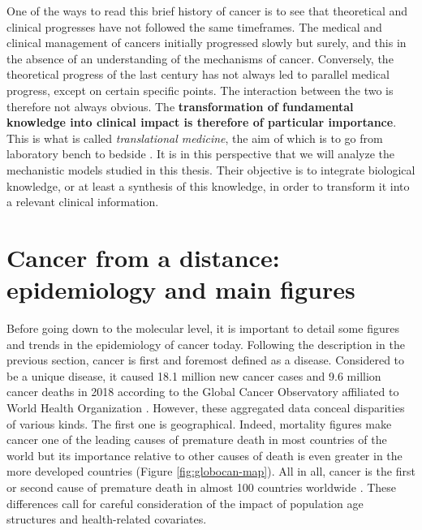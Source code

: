 \documentclass[a4paper,12pt,twoside,onecolumn,openright,final,oldfontcommands]{memoir}
\begin{document}
One of the ways to read this brief history of cancer is to see that
theoretical and clinical progresses have not followed the same
timeframes. The medical and clinical management of cancers initially
progressed slowly but surely, and this in the absence of an
understanding of the mechanisms of cancer. Conversely, the theoretical
progress of the last century has not always led to parallel medical
progress, except on certain specific points. The interaction between the
two is therefore not always obvious. The \textbf{transformation of
fundamental knowledge into clinical impact is therefore of particular
importance}. This is what is called \emph{translational medicine}, the
aim of which is to go from laboratory bench to bedside
\citep{cohrs2015translational}. It is in this perspective that we will
analyze the mechanistic models studied in this thesis. Their objective
is to integrate biological knowledge, or at least a synthesis of this
knowledge, in order to transform it into a relevant clinical
information.

\section{Cancer from a distance: epidemiology and main
figures}\label{epidemio}

Before going down to the molecular level, it is important to detail some
figures and trends in the epidemiology of cancer today. Following the
description in the previous section, cancer is first and foremost
defined as a disease. Considered to be a unique disease, it caused 18.1
million new cancer cases and 9.6 million cancer deaths in 2018 according
to the Global Cancer Observatory affiliated to World Health Organization
\citep{bray2018global}. However, these aggregated data conceal
disparities of various kinds. The first one is geographical. Indeed,
mortality figures make cancer one of the leading causes of premature
death in most countries of the world but its importance relative to
other causes of death is even greater in the more developed countries
(Figure \ref{fig:globocan-map}). All in all, cancer is the first or
second cause of premature death in almost 100 countries worldwide
\citep{bray2018global}. These differences call for careful consideration
of the impact of population age structures and health-related
covariates.
\end{document}
